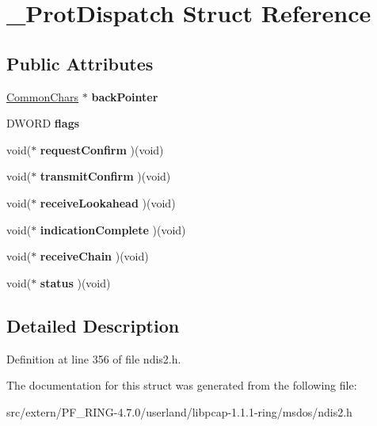 \hypertarget{struct___prot_dispatch}{
\section{\_\-ProtDispatch Struct Reference}
\label{struct___prot_dispatch}
}
\subsection*{Public Attributes}
\begin{DoxyCompactItemize}
\item 
\hypertarget{struct___prot_dispatch_a6e8db2f6528ae31eb7579aee89047f22}{
\hyperlink{struct___common_chars}{CommonChars} $\ast$ {\bfseries backPointer}}
\label{struct___prot_dispatch_a6e8db2f6528ae31eb7579aee89047f22}

\item 
\hypertarget{struct___prot_dispatch_a1f90599a509c9d9a63e49e312ba4c1c7}{
DWORD {\bfseries flags}}
\label{struct___prot_dispatch_a1f90599a509c9d9a63e49e312ba4c1c7}

\item 
\hypertarget{struct___prot_dispatch_aa6c02d635717dd47f6883915410f7ebd}{
void($\ast$ {\bfseries requestConfirm} )(void)}
\label{struct___prot_dispatch_aa6c02d635717dd47f6883915410f7ebd}

\item 
\hypertarget{struct___prot_dispatch_af4f87dff1c6a6da1037bd3bc4f07a6d2}{
void($\ast$ {\bfseries transmitConfirm} )(void)}
\label{struct___prot_dispatch_af4f87dff1c6a6da1037bd3bc4f07a6d2}

\item 
\hypertarget{struct___prot_dispatch_a8f004d164246a42b5e90424be5a47723}{
void($\ast$ {\bfseries receiveLookahead} )(void)}
\label{struct___prot_dispatch_a8f004d164246a42b5e90424be5a47723}

\item 
\hypertarget{struct___prot_dispatch_af4a2e22371e4a468fc09456f95f6e3d2}{
void($\ast$ {\bfseries indicationComplete} )(void)}
\label{struct___prot_dispatch_af4a2e22371e4a468fc09456f95f6e3d2}

\item 
\hypertarget{struct___prot_dispatch_ad7d83731f8a5d8c037d7206865622866}{
void($\ast$ {\bfseries receiveChain} )(void)}
\label{struct___prot_dispatch_ad7d83731f8a5d8c037d7206865622866}

\item 
\hypertarget{struct___prot_dispatch_a5210f42269336f747206bf5a0665ff11}{
void($\ast$ {\bfseries status} )(void)}
\label{struct___prot_dispatch_a5210f42269336f747206bf5a0665ff11}

\end{DoxyCompactItemize}


\subsection{Detailed Description}


Definition at line 356 of file ndis2.h.



The documentation for this struct was generated from the following file:\begin{DoxyCompactItemize}
\item 
src/extern/PF\_\-RING-\/4.7.0/userland/libpcap-\/1.1.1-\/ring/msdos/ndis2.h\end{DoxyCompactItemize}

